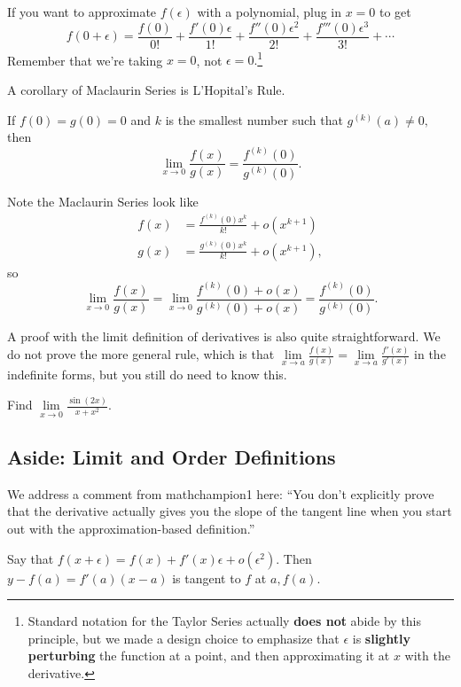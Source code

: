 \documentclass{article}
\begin{document}
\begin{defi}
If you want to approximate $f(\epsilon)$ with a polynomial, plug in $x=0$ to get
\[f(0+\epsilon)=\frac{f(0)}{0!}+\frac{f'(0)\epsilon}{1!}+\frac{f''(0)\epsilon^2}{2!}+\frac{f'''(0)\epsilon^3}{3!}+\cdots\]
Remember that we're taking $x=0$, not $\epsilon=0.$\footnote{Standard notation for the Taylor Series actually \textbf{does not} abide by this principle, but we made a design choice to emphasize that $\epsilon$ is \textbf{slightly perturbing} the function at a point, and then approximating it at $x$ with the derivative.}
\end{defi}

A corollary of Maclaurin Series is L'Hopital's Rule.

\begin{theo}
If $f(0)=g(0)=0$ and $k$ is the smallest number such that $g^{(k)}(a)\neq 0,$ then
\[\lim_{x\to 0}\frac{f(x)}{g(x)}=\frac{f^{(k)}(0)}{g^{(k)}(0)}.\]
\end{theo}

\begin{pro}
Note the Maclaurin Series look like
\begin{align*}
f(x)&=\frac{f^{(k)}(0)x^k}{k!}+o(x^{k+1})\\
g(x)&=\frac{g^{(k)}(0)x^k}{k!}+o(x^{k+1}),
\end{align*}
so
\[\lim_{x\to 0}\frac{f(x)}{g(x)}=\lim_{x\to 0}\frac{f^{(k)}(0)+o(x)}{g^{(k)}(0)+o(x)}=\frac{f^{(k)}(0)}{g^{(k)}(0)}.\]
\end{pro}

A proof with the limit definition of derivatives is also quite straightforward. We do not prove the more general rule, which is that $\lim\limits_{x\to a}\frac{f(x)}{g(x)}=\lim\limits_{x\to a}\frac{f'(x)}{g'(x)}$ in the indefinite forms, but you still do need to know this.

\begin{exer}
Find $\lim\limits_{x\to 0}\frac{\sin(2x)}{x+x^2}.$
\end{exer}

\subsection{Aside: Limit and Order Definitions}
We address a comment from mathchampion1 here: ``You don't explicitly prove that the derivative actually gives you the slope of the tangent line when you start out with the approximation-based definition.''

\begin{theo}
Say that $f(x+\epsilon)=f(x)+f'(x)\epsilon+o(\epsilon^2).$ Then $y-f(a)=f'(a)(x-a)$ is tangent to $f$ at $a,f(a).$
\end{theo}
\end{document}
